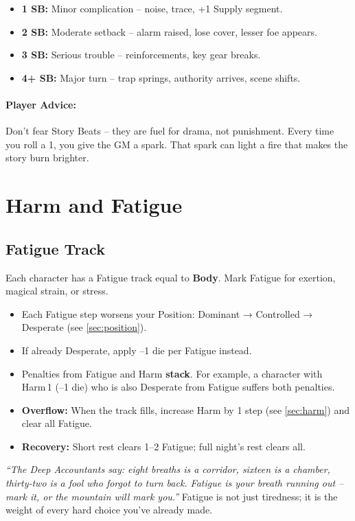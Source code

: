 \begin{itemize}
  \item \textbf{1 SB:} Minor complication – noise, trace, +1 Supply segment.
  \item \textbf{2 SB:} Moderate setback – alarm raised, lose cover, lesser foe appears.
  \item \textbf{3 SB:} Serious trouble – reinforcements, key gear breaks.
  \item \textbf{4+ SB:} Major turn – trap springs, authority arrives, scene shifts.
\end{itemize}

\paragraph{Player Advice:} Don’t fear Story Beats – they are fuel for drama, not punishment. Every time you roll a 1, you give the GM a spark. That spark can light a fire that makes the story burn brighter.

\section{Harm and Fatigue}
\label{sec:harm-fatigue}

\subsection{Fatigue Track}
\label{sec:fatigue}
Each character has a Fatigue track equal to \textbf{Body}. Mark Fatigue for exertion, magical strain, or stress.

\begin{itemize}
  \item Each Fatigue step worsens your Position: Dominant → Controlled → Desperate (see \ref{sec:position}).
  \item If already Desperate, apply –1 die per Fatigue instead.
  \item Penalties from Fatigue and Harm \textbf{stack}. For example, a character with Harm 1 (–1 die) who is also Desperate from Fatigue suffers both penalties.
  \item \textbf{Overflow:} When the track fills, increase Harm by 1 step (see \ref{sec:harm}) and clear all Fatigue.
  \item \textbf{Recovery:} Short rest clears 1–2 Fatigue; full night’s rest clears all.
\end{itemize}

\begin{tcolorbox}[colback=brown!5!white,colframe=brown!70!black,title=Aeler Breath‑Counting]
\emph{“The Deep Accountants say: eight breaths is a corridor, sixteen is a chamber, thirty‑two is a fool who forgot to turn back. Fatigue is your breath running out – mark it, or the mountain will mark you.”}  
Fatigue is not just tiredness; it is the weight of every hard choice you’ve already made.
\end{tcolorbox}

